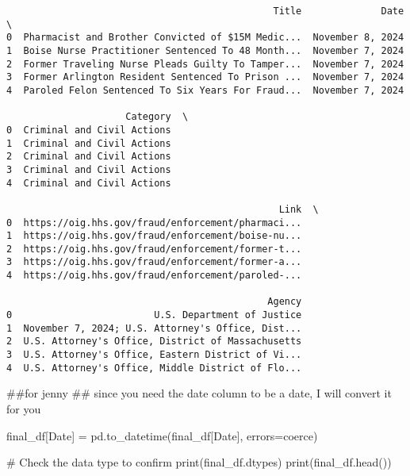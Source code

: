 \documentclass[
  letterpaper,
  DIV=11,
  numbers=noendperiod]{scrartcl}
\newenvironment{Shaded}{\begin{snugshade}}{\end{snugshade}}
\newcommand{\BuiltInTok}[1]{\textcolor[rgb]{0.00,0.23,0.31}{#1}}
\newcommand{\CommentTok}[1]{\textcolor[rgb]{0.37,0.37,0.37}{#1}}
\newcommand{\NormalTok}[1]{\textcolor[rgb]{0.00,0.23,0.31}{#1}}
\newcommand{\OperatorTok}[1]{\textcolor[rgb]{0.37,0.37,0.37}{#1}}
\newcommand{\StringTok}[1]{\textcolor[rgb]{0.13,0.47,0.30}{#1}}
\begin{document}
\begin{verbatim}
                                               Title              Date  \
0  Pharmacist and Brother Convicted of $15M Medic...  November 8, 2024   
1  Boise Nurse Practitioner Sentenced To 48 Month...  November 7, 2024   
2  Former Traveling Nurse Pleads Guilty To Tamper...  November 7, 2024   
3  Former Arlington Resident Sentenced To Prison ...  November 7, 2024   
4  Paroled Felon Sentenced To Six Years For Fraud...  November 7, 2024   

                     Category  \
0  Criminal and Civil Actions   
1  Criminal and Civil Actions   
2  Criminal and Civil Actions   
3  Criminal and Civil Actions   
4  Criminal and Civil Actions   

                                                Link  \
0  https://oig.hhs.gov/fraud/enforcement/pharmaci...   
1  https://oig.hhs.gov/fraud/enforcement/boise-nu...   
2  https://oig.hhs.gov/fraud/enforcement/former-t...   
3  https://oig.hhs.gov/fraud/enforcement/former-a...   
4  https://oig.hhs.gov/fraud/enforcement/paroled-...   

                                              Agency  
0                         U.S. Department of Justice  
1  November 7, 2024; U.S. Attorney's Office, Dist...  
2  U.S. Attorney's Office, District of Massachusetts  
3  U.S. Attorney's Office, Eastern District of Vi...  
4  U.S. Attorney's Office, Middle District of Flo...  
\end{verbatim}

\begin{Shaded}
\begin{Highlighting}[]
\CommentTok{\#\#for jenny}
\CommentTok{\#\# since you need the date column to be a date, I will convert it for you}

\NormalTok{final\_df[}\StringTok{\textquotesingle{}Date\textquotesingle{}}\NormalTok{] }\OperatorTok{=}\NormalTok{ pd.to\_datetime(final\_df[}\StringTok{\textquotesingle{}Date\textquotesingle{}}\NormalTok{], errors}\OperatorTok{=}\StringTok{\textquotesingle{}coerce\textquotesingle{}}\NormalTok{)}

\CommentTok{\# Check the data type to confirm}
\BuiltInTok{print}\NormalTok{(final\_df.dtypes)}
\BuiltInTok{print}\NormalTok{(final\_df.head())}
\end{Highlighting}
\end{Shaded}
\end{document}
